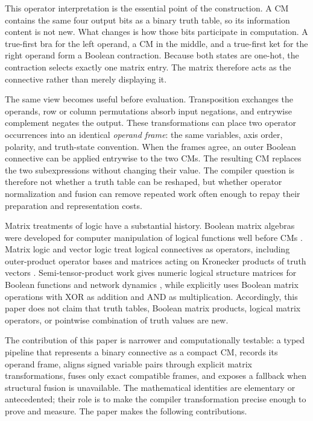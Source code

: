 \documentclass[11pt]{article}
\begin{document}
This operator interpretation is the essential point of the construction. A
CM contains the same four output bits as a binary truth table, so its
information content is not new. What changes is how those bits participate in
computation. A true-first bra for the left operand, a CM in the middle, and a
true-first ket for the right operand form a Boolean contraction. Because both
states are one-hot, the contraction selects exactly one matrix entry. The
matrix therefore acts as the connective rather than merely displaying it.

The same view becomes useful before evaluation. Transposition exchanges the
operands, row or column permutations absorb input negations, and entrywise
complement negates the output. These transformations can place two operator
occurrences into an identical \emph{operand frame}: the same variables, axis
order, polarity, and truth-state convention. When the frames agree, an outer
Boolean connective can be applied entrywise to the two CMs. The resulting CM
replaces the two subexpressions without changing their value. The compiler
question is therefore not whether a truth table can be reshaped, but whether
operator normalization and fusion can remove repeated work often enough to
repay their preparation and representation costs.

Matrix treatments of logic have a substantial history. Boolean matrix
algebras were developed for computer manipulation of logical functions well
before CMs \citep{edwards1972}. Matrix logic and vector logic treat logical
connectives as operators, including outer-product operator bases and matrices
acting on Kronecker products of truth vectors \citep{stern1988,mizraji1992,
mizraji2008}. Semi-tensor-product work gives numeric logical structure
matrices for Boolean functions and network dynamics
\citep{chengqi2010,zhaogaocheng}, while \citet{chengzhaoxu2011} explicitly
uses Boolean matrix operations with XOR as addition and AND as multiplication.
Accordingly, this paper does not claim that truth tables, Boolean matrix
products, logical matrix operators, or pointwise combination of truth values
are new.

The contribution of this paper is narrower and computationally testable: a
typed pipeline that represents a binary connective as a compact CM, records
its operand frame, aligns signed variable pairs through explicit matrix
transformations, fuses only exact compatible frames, and exposes a fallback
when structural fusion is unavailable. The mathematical identities are
elementary or antecedented; their role is to make the compiler transformation
precise enough to prove and measure. The paper makes the following
contributions.
\end{document}
